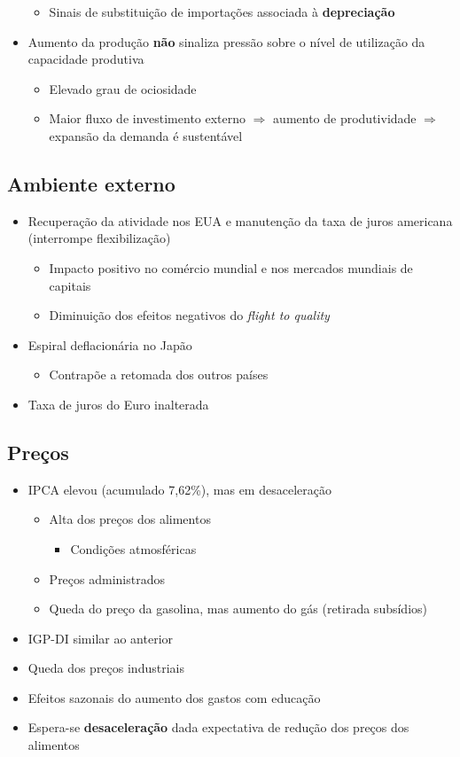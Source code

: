 \documentclass[11pt]{article}
\begin{document}
\begin{itemize}
\begin{itemize}
\item Sinais de substituição de importações associada à \textbf{depreciação}
\end{itemize}
\item Aumento da produção \textbf{não} sinaliza pressão sobre o nível de utilização da capacidade produtiva
\begin{itemize}
\item Elevado grau de ociosidade
\item Maior fluxo de investimento externo \(\Rightarrow\) aumento de produtividade \(\Rightarrow\) expansão da demanda é sustentável
\end{itemize}
\end{itemize}
\subsection*{Ambiente externo}
\label{sec:org108547f}
\begin{itemize}
\item Recuperação da atividade nos EUA e manutenção da taxa de juros americana (interrompe flexibilização)
\begin{itemize}
\item Impacto positivo no comércio mundial e nos mercados mundiais de capitais
\item Diminuição dos efeitos negativos do \emph{flight to quality}
\end{itemize}
\item Espiral deflacionária no Japão
\begin{itemize}
\item Contrapõe a retomada dos outros países
\end{itemize}
\item Taxa de juros do Euro inalterada
\end{itemize}
\subsection*{Preços}
\label{sec:org25dd506}
\begin{itemize}
\item IPCA elevou (acumulado 7,62\%), mas em desaceleração
\begin{itemize}
\item Alta dos preços dos alimentos
\begin{itemize}
\item Condições atmosféricas
\end{itemize}
\item Preços administrados
\item Queda do preço da gasolina, mas aumento do gás (retirada subsídios)
\end{itemize}
\item IGP-DI similar ao anterior
\item Queda dos preços industriais
\item Efeitos sazonais do aumento dos gastos com educação
\item Espera-se \textbf{desaceleração} dada expectativa de redução dos preços dos alimentos
\end{itemize}
\end{document}
